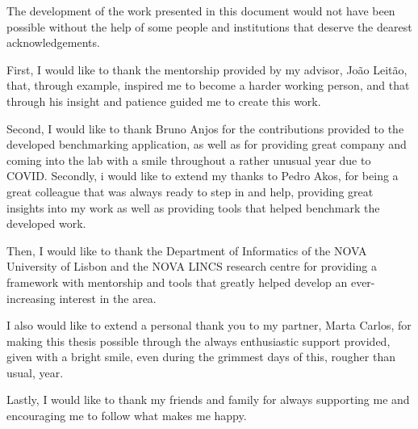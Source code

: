 

\begin{ntacknowledgements}


The development of the work presented in this document would not have been possible without the help of some people and institutions that deserve the dearest acknowledgements.

First, I would like to thank the mentorship provided by my advisor, João Leitão, that, through example, inspired me to become a harder working person, and that through his insight and patience guided me to create this work.

Second, I would like to thank Bruno Anjos for the contributions provided to the developed benchmarking application, as well as for providing great company and coming into the lab with a smile throughout a rather unusual year due to COVID. Secondly, i would like to extend my thanks to Pedro Akos, for being a great colleague that was always ready to step in and help, providing great insights into my work as well as providing tools that helped benchmark the developed work.

Then, I would like to thank the Department of Informatics of the NOVA University of Lisbon and the NOVA LINCS research centre for providing a framework with mentorship and tools that greatly helped develop an ever-increasing interest in the area.

I also would like to extend a personal thank you to my partner, Marta Carlos, for making this thesis possible through the always enthusiastic support provided, given with a bright smile, even during the grimmest days of this, rougher than usual, year.

Lastly, I would like to thank my friends and family for always supporting me and encouraging me to follow what makes me happy.



\end{ntacknowledgements}